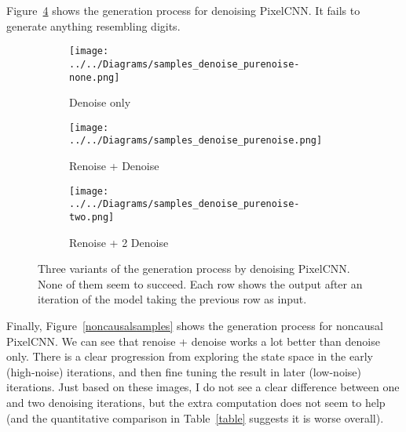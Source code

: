 \documentclass[11pt, a4paper, openany]{book}
\begin{document}
Figure~\ref{denoisesamples} shows the generation process for denoising PixelCNN. It fails to generate anything resembling digits.

\begin{figure}
  \centering    
    \begin{subfigure}{0.32\columnwidth}
        \centering
        \caption{Denoise only}
        \texttt{[image: ../../Diagrams/samples\_denoise\_purenoise-none.png]} 
        \label{denoisesamples:none}
    \end{subfigure}
    \hfill
    \begin{subfigure}{0.32\columnwidth}
        \centering
        \caption{Renoise + Denoise}
        \texttt{[image: ../../Diagrams/samples\_denoise\_purenoise.png]} 
        \label{denoisesamples:renoise}
    \end{subfigure}
    \hfill
    \begin{subfigure}{0.32\columnwidth}
        \centering
        \caption{Renoise + 2 Denoise}
        \texttt{[image: ../../Diagrams/samples\_denoise\_purenoise-two.png]} 
        \label{denoisesamples:two}
    \end{subfigure}
  \caption[Generation process by denoising PixelCNN]{Three variants of the generation process by denoising PixelCNN. None of them seem to succeed. Each row shows the output after an iteration of the model taking the previous row as input.}
  \label{denoisesamples}
\end{figure}

Finally, Figure~\ref{noncausalsamples} shows the generation process for noncausal PixelCNN. We can see that renoise + denoise works a lot better than denoise only. There is a clear progression from exploring the state space in the early (high-noise) iterations, and then fine tuning the result in later (low-noise) iterations. Just based on these images, I do not see a clear difference between one and two denoising iterations, but the extra computation does not seem to help (and the quantitative comparison in Table~\ref{table} suggests it is worse overall).
\end{document}
